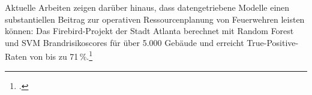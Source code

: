 \documentclass[12pt,a4paper]{article}
\begin{document}
Aktuelle Arbeiten zeigen darüber hinaus, dass datengetriebene Modelle einen substantiellen Beitrag
zur operativen Ressourcenplanung von Feuerwehren leisten können: Das Firebird-Projekt der Stadt
Atlanta berechnet mit Random Forest und SVM Brandrisikoscores für über 5.000 Gebäude und erreicht
True-Positive-Raten von bis zu 71\,\%.\footcite[1-2]{Madaio2016}


%
%
%
%
\end{document}
